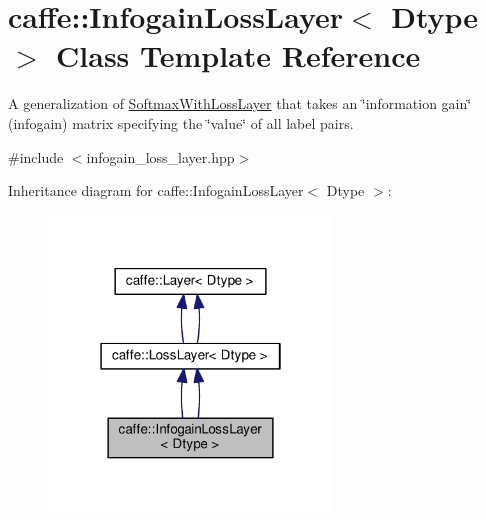 \hypertarget{classcaffe_1_1_infogain_loss_layer}{}\section{caffe\+:\+:Infogain\+Loss\+Layer$<$ Dtype $>$ Class Template Reference}
\label{classcaffe_1_1_infogain_loss_layer}


A generalization of \mbox{\hyperlink{classcaffe_1_1_softmax_with_loss_layer}{Softmax\+With\+Loss\+Layer}} that takes an \char`\"{}information gain\char`\"{} (infogain) matrix specifying the \char`\"{}value\char`\"{} of all label pairs.  




{\ttfamily \#include $<$infogain\+\_\+loss\+\_\+layer.\+hpp$>$}



Inheritance diagram for caffe\+:\+:Infogain\+Loss\+Layer$<$ Dtype $>$\+:
\nopagebreak
\begin{figure}[H]
\begin{center}
\leavevmode
\includegraphics[width=214pt]{classcaffe_1_1_infogain_loss_layer__inherit__graph}
\end{center}
\end{figure}
